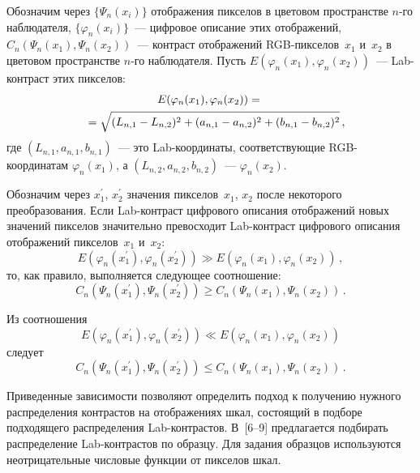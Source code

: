 \begin{multicols}{2}
  Обозначим через $\{\Psi_n(x_i)\}$ отображения пикселов в цветовом 
пространстве $n$-го наблюдателя, $\{\varphi_n(x_i)\}$~--- цифровое описание 
этих отображений, $C_n(\Psi_n(x_1),\Psi_n(x_2))$~--- контраст отображений 
  RGB-пик\-се\-лов~$x_1$ и~$x_2$ в цветовом пространстве $n$-го 
наблюдателя. Пусть $E(\varphi_n(x_1),\varphi_n(x_2))$~--- Lab-конт\-раст этих 
пикселов:
\begin{multline*}
  E(\varphi_n(x_1),\varphi_n(x_2)) ={}\\
  {}= \sqrt{(L_{n,1}-L_{n,2})^2+(a_{n,1} - 
a_{n,2})^2 + (b_{n,1}-b_{n,2})^2}\,,\hspace*{-8.09448pt}
  \end{multline*}
где $(L_{n,1}, a_{n,1}, b_{n,1})$~--- это Lab-ко\-ор\-ди\-на\-ты, 
соответствующие RGB-ко\-ор\-ди\-на\-там $\varphi_n(x_1)$, а 
$(L_{n,2},a_{n,2},b_{n,2})$~--- $\varphi_n(x_2)$.

  Обозначим через $x_1^\prime$, $x_2^\prime$ значения пикселов~$x_1$, $x_2$ 
после некоторого преобразования. Если Lab-конт\-раст цифрового описания 
отображений новых значений пикселов значительно превосходит 
  Lab-конт\-раст цифрового описания отображений пикселов~$x_1$ и~$x_2$: 
  $$
E(\varphi_n(x^\prime_1),\varphi_n(x^\prime_2)) \gg E(\varphi_n(x_1), 
\varphi_n(x_2))\,, 
$$
то, как правило, выполняется следующее соотношение:
$$
C_n(\Psi_n(x^\prime_1),\Psi_n(x^\prime_2)) \geq C_n (\Psi_n(x_1),\Psi_n(x_2))\,. 
$$
  
  Из соотношения
  $$
E(\varphi_n(x^\prime_1),\varphi_n(x^\prime_2)) \ll E (\varphi_n(x_1),\varphi_n(x_2)) 
$$
следует
$$
C_n (\Psi_n(x^\prime_1),\Psi_n(x^\prime_2)) \leq C_n (\Psi_n(x_1),\Psi_n(x_2))\,. 
$$

  Приведенные зависимости позволяют определить подход к получению 
нужного распределения контрастов на отображениях шкал, состоящий в 
подборе подходящего распределения Lab-конт\-рас\-тов. 
  В~[6--9] предлагается подбирать распределение 
  Lab-конт\-рас\-тов по образцу. Для задания образцов используются 
неотрицательные числовые функции от пикселов шкал. 
  

\end{multicols}
